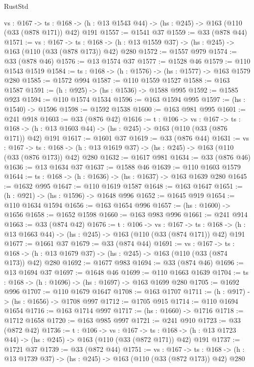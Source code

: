 \begin{lexlean}{RustStd}
\begin{coremodule}
  {vs : @167} ->
  {ts : @168} -> (h : @13 @1543 @44) -> (hs : @245) -> @163 (@110 (@33 (@878 @171)) @42) @191
@1557 := @1541 @37
@1559 := @33 (@878 @44)
@1571 := {vs : @167} ->
  {ts : @168} -> (h : @13 @1559 @37) -> (hs : @245) -> @163 (@110 (@33 (@878 @173)) @42) @280
@1572 := @1557 @979
@1574 := @33 (@878 @46)
@1576 := @13 @1574 @37
@1577 := @1528 @46
@1579 := @110 @1543 @1519
@1584 := {ts : @168} -> (h : @1576) -> (hs : @1577) -> @163 @1579 @280
@1585 := @1572 @994
@1587 := @110 @1559 @1527
@1588 := @163 @1587
@1591 := (h : @925) -> (hs : @1536) -> @1588 @995
@1592 := @1585 @923
@1594 := @110 @1574 @1534
@1596 := @163 @1594 @995
@1597 := (hs : @1540) -> @1596
@1598 := @1592 @1538
@1600 := @163 @981 @995
@1601 := @241 @918
@1603 := @33 (@876 @42)
@1616 := {t : @106} ->
  {vs : @167} ->
  {ts : @168} -> (h : @13 @1603 @44) -> (hs : @245) -> @163 (@110 (@33 (@876 @171)) @42) @191
@1617 := @1601 @37
@1619 := @33 (@876 @44)
@1631 := {vs : @167} ->
  {ts : @168} -> (h : @13 @1619 @37) -> (hs : @245) -> @163 (@110 (@33 (@876 @173)) @42) @280
@1632 := @1617 @981
@1634 := @33 (@876 @46)
@1636 := @13 @1634 @37
@1637 := @1588 @46
@1639 := @110 @1603 @1579
@1644 := {ts : @168} -> (h : @1636) -> (hs : @1637) -> @163 @1639 @280
@1645 := @1632 @995
@1647 := @110 @1619 @1587
@1648 := @163 @1647
@1651 := (h : @921) -> (hs : @1596) -> @1648 @996
@1652 := @1645 @919
@1654 := @110 @1634 @1594
@1656 := @163 @1654 @996
@1657 := (hs : @1600) -> @1656
@1658 := @1652 @1598
@1660 := @163 @983 @996
@1661 := @241 @914
@1663 := @33 (@874 @42)
@1676 := {t : @106} ->
  {vs : @167} ->
  {ts : @168} -> (h : @13 @1663 @44) -> (hs : @245) -> @163 (@110 (@33 (@874 @171)) @42) @191
@1677 := @1661 @37
@1679 := @33 (@874 @44)
@1691 := {vs : @167} ->
  {ts : @168} -> (h : @13 @1679 @37) -> (hs : @245) -> @163 (@110 (@33 (@874 @173)) @42) @280
@1692 := @1677 @983
@1694 := @33 (@874 @46)
@1696 := @13 @1694 @37
@1697 := @1648 @46
@1699 := @110 @1663 @1639
@1704 := {ts : @168} -> (h : @1696) -> (hs : @1697) -> @163 @1699 @280
@1705 := @1692 @996
@1707 := @110 @1679 @1647
@1708 := @163 @1707
@1711 := (h : @917) -> (hs : @1656) -> @1708 @997
@1712 := @1705 @915
@1714 := @110 @1694 @1654
@1716 := @163 @1714 @997
@1717 := (hs : @1660) -> @1716
@1718 := @1712 @1658
@1720 := @163 @985 @997
@1721 := @241 @910
@1723 := @33 (@872 @42)
@1736 := {t : @106} ->
  {vs : @167} ->
  {ts : @168} -> (h : @13 @1723 @44) -> (hs : @245) -> @163 (@110 (@33 (@872 @171)) @42) @191
@1737 := @1721 @37
@1739 := @33 (@872 @44)
@1751 := {vs : @167} ->
  {ts : @168} -> (h : @13 @1739 @37) -> (hs : @245) -> @163 (@110 (@33 (@872 @173)) @42) @280

\end{coremodule}
\end{lexlean}
